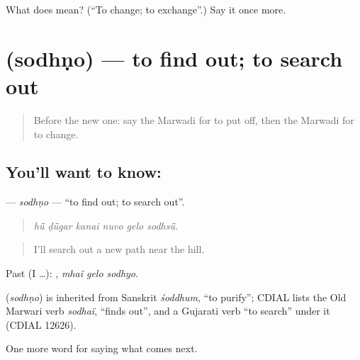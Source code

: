 \begin{tcolorbox}[breakable,colback=teal!4,colframe=teal!35!black,title={Before you move on}]
What does  mean? (\textquotedblleft{}To change; to exchange\textquotedblright{}.) Say it once more.
\end{tcolorbox}
\section[\texorpdfstring{\mw{सोधणो} (sodhṇo)}{सोधणो (sodhṇo)}]{ (sodhṇo) — to find out; to search out}

\label{lesson:MW-C220-sodhno}



\begin{quote}
Before the new one: say the Marwadi for to put off, then the Marwadi for to change.
\end{quote}

\subsection*{You'll want to know: }
\textbf{} — \emph{sodhṇo} — \textquotedblleft{}to find out; to search out\textquotedblright{}.

\begin{quote}
     
\end{quote}

\begin{quote}
\emph{hū̃ ḍū̃gar kanai nuvo gelo sodhsū̃.}
\end{quote}

\begin{quote}
I'll search out a new path near the hill.
\end{quote}

Past (I …):   , \emph{mhaĩ gelo sodhyo}.

\begin{cousinweb}
\textbf{} (\emph{sodhṇo}) is inherited from Sanskrit \emph{śoddhum}, \textquotedblleft{}to purify\textquotedblright{}; CDIAL lists the Old Marwari verb \emph{sodhaï}, \textquotedblleft{}finds out\textquotedblright{}, and a Gujarati verb \textquotedblleft{}to search\textquotedblright{} under it (CDIAL 12626).
\end{cousinweb}

\begin{grammarlens}[title={What you've built}]
One more word for saying what comes next.
\end{grammarlens}

